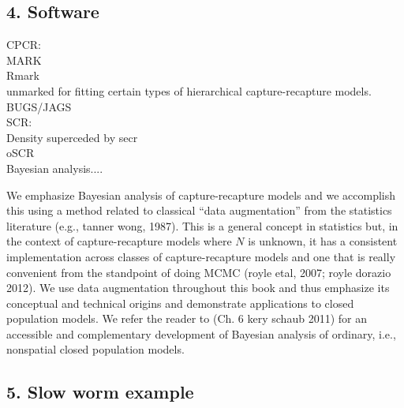 \documentclass{book}
\begin{document}
\subsection*{4. Software}

CPCR:\\
  MARK\\
  Rmark\\
  unmarked for fitting certain types of hierarchical capture-recapture models.\\
  BUGS/JAGS\\
SCR:\\
  Density superceded by secr\\
  oSCR\\

Bayesian analysis....

We emphasize Bayesian analysis of capture-recapture models and we
accomplish this using a method related to classical ``data
augmentation'' from the statistics literature (e.g., tanner wong, 1987).  This is a general concept in
statistics but, in the context of capture-recapture models where $N$
is unknown, it has a consistent implementation across classes of
capture-recapture models and one that is really convenient from the
standpoint of doing MCMC
(royle etal, 2007; royle dorazio 2012). We use data augmentation
throughout this book and thus emphasize its conceptual and technical
origins and demonstrate applications to closed population models.  We
refer the reader to (Ch. 6 kery schaub 2011) for an
accessible and complementary development of Bayesian analysis of
ordinary, i.e., nonspatial closed population models.



\subsection*{5. Slow worm example}
\end{document}
